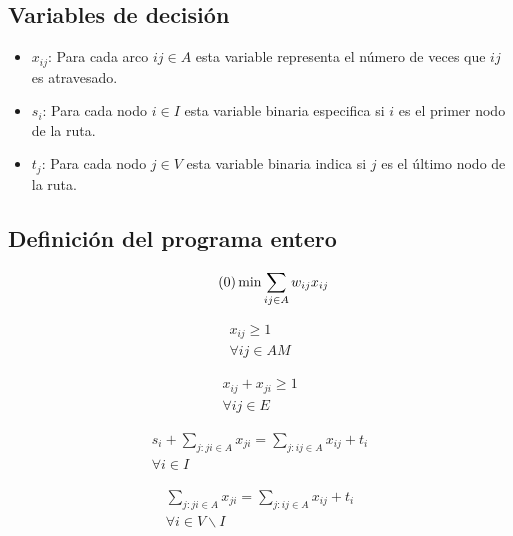 \subsection{Variables de decisión}
\begin{itemize}
\item $x_{i j}$: Para cada arco $ {i j} \in A$ esta variable representa el número de veces que $i j$ es atravesado.

\item $s_i$: Para cada nodo $i \in I$ esta variable binaria especifica si  $i$ es el primer nodo de la ruta.

\item $t_j$: Para cada nodo $j \in V$ esta variable binaria indica si $j$ es el último nodo de la ruta.
\end{itemize}

\subsection{Definición del programa entero}
\label{sec:programa-entero}
\begin{equation*} \tag{0} \label{eq0}
\min \sum_{i j \in A} w_{i j} x_{i j}  \\
\end{equation*} 
\hbox{}

\begin{equation} \tag{1} \label{eq1}
\begin{gathered}
x_{i j} \geq 1 \\
\forall i j \in A M
\end{gathered}
\end{equation} 
\hbox{}

\begin{equation} \tag{2} \label{eq2}
\begin{gathered}
x_{i j} + x_{j i} \geq 1 \\
\forall i j \in E
\end{gathered}
\end{equation}
\hbox{}

\begin{equation} \tag{3a} \label{eq3a}
\begin{gathered}
s_i + \sum_{j: j i \in A} x_{j i} = \sum_{j: i j \in A} x_{i j} + t_i \\
\forall i \in I
\end{gathered}
\end{equation} 
\hbox{}

\begin{equation} \tag{3b} \label{eq3b}
\begin{gathered}
\sum_{j: j i \in A} x_{j i} = \sum_{j: i j \in A} x_{i j} + t_i \\
\forall i \in V\backslash I
\end{gathered}
\end{equation}
\hbox{}


